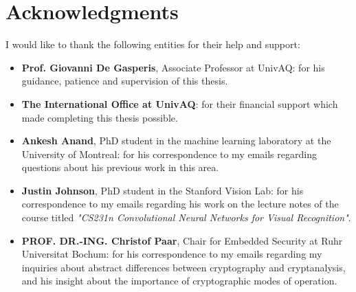 \documentclass[a4paper, 12pt]{report}
\begin{document}
\chapter*{Acknowledgments}
I would like to thank the following entities for their help and support:
\begin{itemize}
	\item \textbf{Prof. Giovanni De Gasperis}, Associate Professor at UnivAQ: for his guidance, patience and supervision of this thesis.
	\item \textbf{The International Office at UnivAQ}: for their financial support which made completing this thesis possible.
	\item \textbf{Ankesh Anand}, PhD student in the machine learning laboratory at the University of Montreal: for his correspondence to my emails regarding questions about his previous work in this area\citep{ankeshanand/neural-cryptography-tensorflow}.
	\item \textbf{Justin Johnson}, PhD student in the Stanford Vision Lab: for his correspondence to my emails regarding his work on the lecture notes of the course titled \textit{"CS231n Convolutional Neural Networks for Visual Recognition"}\citep{cs231n}.
	\item \textbf{PROF. DR.-ING. Christof Paar}, Chair for Embedded Security at Ruhr Universitat Bochum: for his correspondence to my emails regarding my inquiries about abstract differences between cryptography and cryptanalysis, and his insight about the importance of cryptographic modes of operation.
\end{itemize}
\newpage
\medskip


\end{document}
